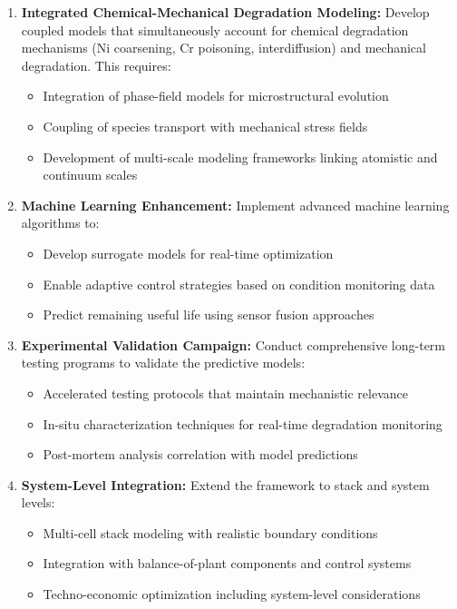 \documentclass[conference]{IEEEtran}
\begin{document}
\begin{enumerate}
\item \textbf{Integrated Chemical-Mechanical Degradation Modeling:} Develop coupled models that simultaneously account for chemical degradation mechanisms (Ni coarsening, Cr poisoning, interdiffusion) and mechanical degradation. This requires:
   \begin{itemize}
   \item Integration of phase-field models for microstructural evolution
   \item Coupling of species transport with mechanical stress fields
   \item Development of multi-scale modeling frameworks linking atomistic and continuum scales
   \end{itemize}

\item \textbf{Machine Learning Enhancement:} Implement advanced machine learning algorithms to:
   \begin{itemize}
   \item Develop surrogate models for real-time optimization
   \item Enable adaptive control strategies based on condition monitoring data
   \item Predict remaining useful life using sensor fusion approaches
   \end{itemize}

\item \textbf{Experimental Validation Campaign:} Conduct comprehensive long-term testing programs to validate the predictive models:
   \begin{itemize}
   \item Accelerated testing protocols that maintain mechanistic relevance
   \item In-situ characterization techniques for real-time degradation monitoring
   \item Post-mortem analysis correlation with model predictions
   \end{itemize}

\item \textbf{System-Level Integration:} Extend the framework to stack and system levels:
   \begin{itemize}
   \item Multi-cell stack modeling with realistic boundary conditions
   \item Integration with balance-of-plant components and control systems
   \item Techno-economic optimization including system-level considerations
   \end{itemize}


\end{enumerate}
\end{document}
